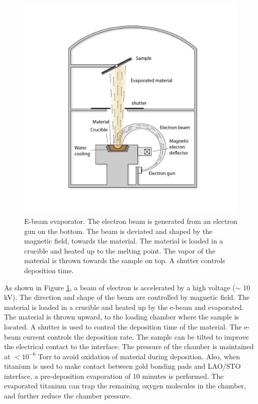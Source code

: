 \documentclass[pdflatex, sectionletters, 12pt]{pittetd}    %
\begin{document}
\begin{figure}[p]
	\centering
	\includegraphics[width=1.0\textwidth]{Drawing/Ebeam.pdf}
	\caption{E-beam evaporator. The electron beam is generated from an electron gun on the bottom. The beam is deviated and shaped by the magnetic field, towards the material. The material is loaded in a crucible and heated up to the melting point. The vapor of the material is thrown towards the sample on top. A shutter controls deposition time.}
	\label{FIG:Ebeam}
\end{figure}

As shown in Figure \ref{FIG:Ebeam}, a beam of electron is accelerated by a high voltage ($\sim$ 10 kV). The direction and shape of the beam are controlled by magnetic field. The material is loaded in a crucible and heated up by the e-beam and evaporated. The material is thrown upward, to the loading chamber where the sample is located. A shutter is used to control the deposition time of the material. The e-beam current controls the deposition rate. The sample can be tilted to improve the electrical contact to the interface. The pressure of the chamber is maintained at $< 10^{-6}$ Torr to avoid oxidation of material during deposition. Also, when titanium is used to make contact between gold bonding pads and LAO/STO interface, a pre-deposition evaporation of 10 minutes is performed. The evaporated titanium can trap the remaining oxygen molecules in the chamber, and further reduce the chamber pressure.
\end{document}
